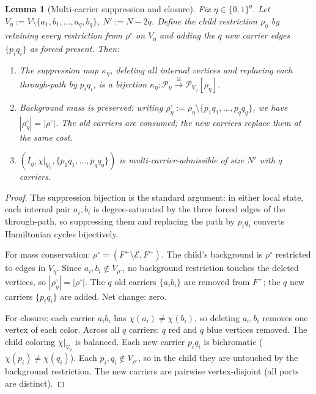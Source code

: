 \documentclass[11pt]{article}
\newtheorem{lemma}[theorem]{Lemma}
\begin{document}
\begin{lemma}[Multi-carrier suppression and closure]
\label{lem:multi-carrier-suppression}
Fix $\eta \in \{0,1\}^q$.  Let
$V_\eta := V \setminus \{a_1, b_1, \ldots, a_q, b_q\}$,
$N' := N - 2q$.  Define the child restriction $\rho_\eta$ by retaining
every restriction from $\rho^\circ$ on $V_\eta$ and adding the $q$ new
carrier edges $\{p_iq_i\}$ as forced present.  Then:
\begin{enumerate}
\item The suppression map $\kappa_\eta$, deleting all internal vertices
  and replacing each through-path by $p_iq_i$, is a bijection
  $\kappa_\eta : \mathcal{P}_\eta \xrightarrow{\cong}
  \mathcal{P}_{V_\eta}[\rho_\eta]$.
\item Background mass is preserved: writing $\rho_\eta^\circ :=
  \rho_\eta \setminus \{p_1q_1, \ldots, p_qq_q\}$, we have
  $|\rho_\eta^\circ| = |\rho^\circ|$.  The old carriers are consumed;
  the new carriers replace them at the same cost.
\item $(I_\eta, \chi|_{V_\eta}, \{p_1q_1, \ldots, p_qq_q\})$ is
  multi-carrier-admissible of size $N'$ with $q$ carriers.
\end{enumerate}
\end{lemma}

\begin{proof}
The suppression bijection is the standard argument: in either local state,
each internal pair $a_i, b_i$ is degree-saturated by the three forced edges
of the through-path, so suppressing them and replacing the path by $p_iq_i$
converts Hamiltonian cycles bijectively.

For mass conservation: $\rho^\circ = (F^+ \setminus \mathcal{E}, F^-)$.
The child's background is $\rho^\circ$ restricted to edges in $V_\eta$.
Since $a_i, b_i \notin V_{\rho^\circ}$, no background restriction touches
the deleted vertices, so $|\rho_\eta^\circ| = |\rho^\circ|$.  The $q$ old
carriers $\{a_ib_i\}$ are removed from $F^+$; the $q$ new carriers
$\{p_iq_i\}$ are added.  Net change: zero.

For closure: each carrier $a_ib_i$ has $\chi(a_i) \neq \chi(b_i)$, so
deleting $a_i, b_i$ removes one vertex of each color.  Across all $q$
carriers: $q$ red and $q$ blue vertices removed.  The child coloring
$\chi|_{V_\eta}$ is balanced.  Each new carrier $p_iq_i$ is bichromatic
($\chi(p_i) \neq \chi(q_i)$).  Each $p_i, q_i \notin V_{\rho^\circ}$, so
in the child they are untouched by the background restriction.  The new
carriers are pairwise vertex-disjoint (all ports are distinct).
\end{proof}
\end{document}
